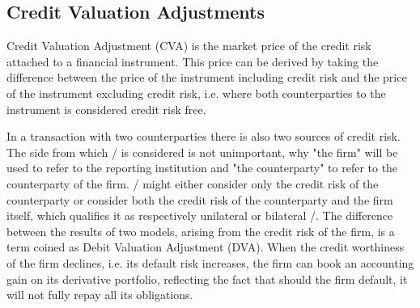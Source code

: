 \documentclass[../../../main.tex]{subfiles}
\begin{document}
    \subsection{Credit Valuation Adjustments}
        Credit Valuation Adjustment (CVA) is the market price of the credit risk attached to a financial instrument.
        This price can be derived by taking the difference between the price of the instrument including credit risk
        and the price of the instrument excluding credit risk, 
        i.e. where both counterparties to the instrument is considered credit risk free.

        In a transaction with two counterparties there is also two sources of credit risk.
        The side from which \CVA/ is considered is not unimportant, 
        why "the firm" will be used to refer to the reporting institution 
        and "the counterparty" to refer to the counterparty of the firm.
        \CVA/ might either consider only the credit risk of the counterparty 
        or consider both the credit risk of the counterparty and the firm itself,
        which qualifies it as respectively unilateral or bilateral \CVA/.
        The difference between the results of two models, arising from the credit risk of the firm,
        is a term coined as Debit Valuation Adjustment (DVA).
        When the credit worthiness of the firm declines, i.e. its default risk increases,
        the firm can book an accounting gain on its derivative portfolio,
        reflecting the fact that should the firm default, it will not fully repay all its obligations.
\end{document}
